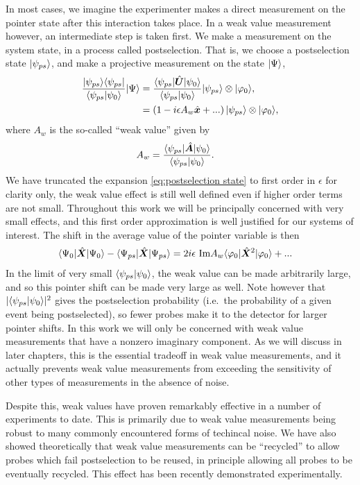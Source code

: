 In most cases, we imagine the experimenter makes a direct measurement on the pointer state after this interaction takes place.  In a weak value measurement however, an intermediate step is taken first.  We make a measurement on the system state, in a process called postselection.  That is, we choose a postselection state $\lvert \psi_{ps}\rangle$, and make a projective measurement on the state $\lvert \Psi\rangle$,
\begin{align}\label{eq:postselection state}
  \nonumber \frac{\lvert \psi_{ps}\rangle\langle \psi_{ps} \rvert}{\langle \psi_{ps} \vert \psi_0 \rangle} \lvert \Psi\rangle &= \frac{\langle \psi_{ps} \rvert\hat{\bm U}\lvert \psi_0\rangle}{\langle \psi_{ps} \vert \psi_0 \rangle}\lvert \psi_{ps}\rangle \otimes \lvert \varphi_0\rangle, \\
                                                                      &= \left(1 - i\epsilon A_w \hat{\bm x} + ...  \right)\lvert \psi_{ps}\rangle \otimes \lvert \varphi_0\rangle,
\end{align}
where $A_w$ is the so-called ``weak value'' given by
\begin{align}
  A_w &= \frac{\langle \psi_{ps} \rvert\hat{\bm A}\lvert \psi_0\rangle}{\langle \psi_{ps} \vert \psi_0 \rangle}.
\end{align}
We have truncated the expansion \eqref{eq:postselection state} to first order in $\epsilon$ for clarity only, the weak value effect is still well defined even if higher order terms are not small.  Throughout this work we will be principally concerned with very small effects, and this first order approximation is well justified for our systems of interest.  The shift in the average value of the pointer variable is then
\begin{align}
  \langle \Psi_0 \rvert\hat{\bm X}\lvert \Psi_0\rangle - \langle \Psi_{ps} \rvert\hat{\bm X}\lvert \Psi_{ps}\rangle &= 2i\epsilon ~\text{Im}{A_w} \langle \varphi_0 \rvert\hat{\bm X}^2\lvert \varphi_0\rangle + ...
\end{align}
In the limit of very small $\langle \psi_{ps} \vert \psi_0 \rangle$, the weak value can be made arbitrarily large, and so this pointer shift can be made very large as well.  Note however that $|\langle \psi_{ps} \vert \psi_0 \rangle|^2$ gives the postselection probability (i.e.~the probability of a given event being postselected), so fewer probes make it to the detector for larger pointer shifts.  In this work we will only be concerned with weak value measurements that have a nonzero imaginary component.  As we will discuss in later chapters, this is the essential tradeoff in weak value measurements, and it actually prevents weak value measurements from exceeding the sensitivity of other types of measurements in the absence of noise.

Despite this, weak values have proven remarkably effective in a number of experiments to date.  This is primarily due to weak value measurements being robust to many commonly encountered forms of techincal noise.  We have also showed theoretically that weak value measurements can be ``recycled'' to allow probes which fail postselection to be reused, in principle allowing all probes to be eventually recycled.  This effect has been recently demonstrated experimentally.

